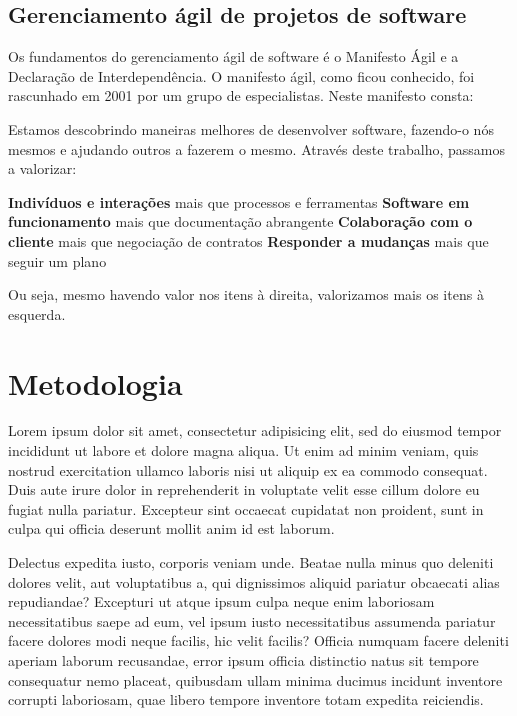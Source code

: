 \documentclass[
    12pt,               %
    openright,          %
    twoside,            %
    a4paper,            %
    chapter=TITLE,     %
    english,            %
    spanish,            %
    portuguese              %
    ]{abntex2}
\begin{document}
\section{Gerenciamento ágil de projetos de software}
Os fundamentos do gerenciamento ágil de software é o Manifesto Ágil e a Declaração de Interdependência.
O manifesto ágil, como ficou conhecido, foi rascunhado em 2001 por um grupo de especialistas. Neste manifesto consta:

\begin{citacao}
Estamos descobrindo maneiras melhores de desenvolver software, fazendo-o nós mesmos e ajudando outros a fazerem o mesmo. Através deste trabalho, passamos a valorizar: 

\textbf{Indivíduos e interações} mais que processos e ferramentas \newline
\textbf{Software em funcionamento} mais que documentação abrangente \newline
\textbf{Colaboração com o cliente} mais que negociação de contratos \newline
\textbf{Responder a mudanças} mais que seguir um plano

Ou seja, mesmo havendo valor nos itens à direita, valorizamos mais os itens à esquerda. \cite{manifesto2001}
\end{citacao}


\chapter{Metodologia}

Lorem ipsum dolor sit amet, consectetur adipisicing elit, sed do eiusmod tempor incididunt ut labore et dolore magna aliqua. Ut enim ad minim veniam, quis nostrud exercitation ullamco laboris nisi ut aliquip ex ea commodo consequat. Duis aute irure dolor in reprehenderit in voluptate velit esse cillum dolore eu fugiat nulla pariatur. Excepteur sint occaecat cupidatat non proident, sunt in culpa qui officia deserunt mollit anim id est laborum.


Delectus expedita iusto, corporis veniam unde. Beatae nulla minus quo deleniti dolores velit, aut voluptatibus a, qui dignissimos aliquid pariatur obcaecati alias repudiandae? Excepturi ut atque ipsum culpa neque enim laboriosam necessitatibus saepe ad eum, vel ipsum iusto necessitatibus assumenda pariatur facere dolores modi neque facilis, hic velit facilis? Officia numquam facere deleniti aperiam laborum recusandae, error ipsum officia distinctio natus sit tempore consequatur nemo placeat, quibusdam ullam minima ducimus incidunt inventore corrupti laboriosam, quae libero tempore inventore totam expedita reiciendis.
\end{document}
